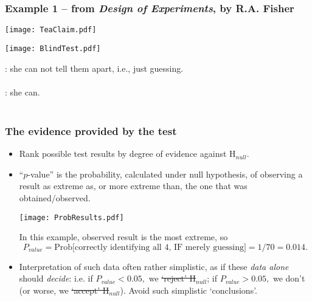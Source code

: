 \documentclass[10pt]{beamer}\usepackage[]{graphicx}\usepackage[]{color}
\begin{document}
\begin{frame}
	
	\frametitle{Example 1 -- from \textit{Design of Experiments}, by R.A. Fisher}
	
	\parindent 128pt
	\texttt{[image: TeaClaim.pdf]}
	\parindent 0pt
	
	\begin{center}
		\texttt{[image: BlindTest.pdf]}
	\end{center}
	: she can not tell them apart, i.e., just guessing. \\ \ \\
	: she can. \\ \ \\ \pause
	
	
	
\end{frame}

\begin{frame}
	\frametitle{The evidence provided by the test}
	
	\begin{footnotesize}
		\begin{itemize}
			\item
			Rank possible test
			results by  degree of evidence against H$_{null}$. 
			\item ``$p$-value'' is the probability, calculated under null hypothesis, of
			observing a result as  extreme as, or more extreme than, the one that was obtained/observed.
			\begin{center}
				\texttt{[image: ProbResults.pdf]}
			\end{center}
			\pause
			In this example, observed result is the most extreme, so
			$$P_{value}=\textrm{Prob[correctly identifying all 4, IF merely guessing]} = 1/70 = 0.014.$$ \pause
			\item
			Interpretation of such data  often  rather simplistic, as if these \textit{data alone} should \textit{decide}:  i.e. if $P_{value} < 0.05,$ we \sout{`reject' H}$_{null}$; if $P_{value} > 0.05,$ we don't (or worse, we \sout{`accept' H}$_{null}$). Avoid such simplistic `conclusions'.
			
		\end{itemize}
	\end{footnotesize}
\end{frame}
\end{document}
